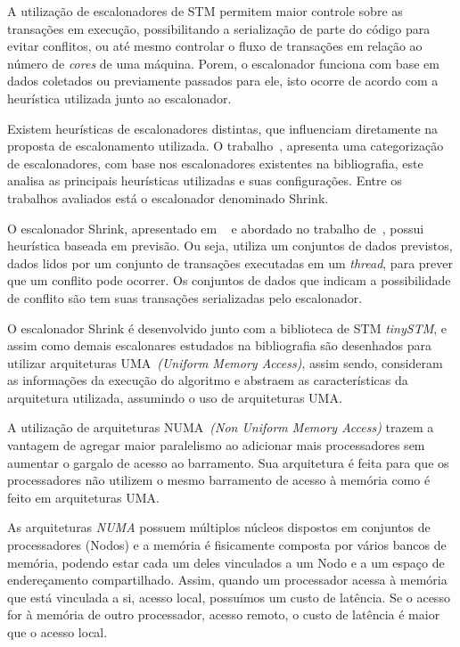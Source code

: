 \documentclass[diss-proposta,nocipinfo]{texufpel}
\begin{document}
A utilização de escalonadores de STM permitem maior controle sobre as transações em execução, possibilitando a serialização de parte do código para evitar conflitos, ou até mesmo controlar o fluxo de transações em relação ao número de \emph{cores} de uma máquina. Porem, o escalonador funciona com base em dados coletados ou previamente passados para ele, isto ocorre de acordo com a heurística utilizada junto ao escalonador.

Existem heurísticas de escalonadores distintas, que influenciam diretamente na proposta de escalonamento utilizada. O trabalho~\cite{sanzo17}, apresenta uma categorização de escalonadores, com base nos escalonadores existentes na bibliografia, este analisa as principais heurísticas utilizadas e suas configurações. Entre os trabalhos avaliados está o escalonador denominado Shrink.

O escalonador Shrink, apresentado em ~\cite{dragojevic09} e abordado no trabalho de~\cite{sanzo17}, possui heurística baseada em previsão. Ou seja, utiliza um conjuntos de dados previstos, dados lidos por um conjunto de transações executadas em um \emph{thread}, para prever que um conflito pode ocorrer. Os conjuntos de dados que indicam a possibilidade de conflito são tem suas transações serializadas pelo escalonador.

O escalonador Shrink é desenvolvido junto com a biblioteca de STM \emph{tinySTM}, e assim como demais escalonares estudados na bibliografia são desenhados para utilizar arquiteturas UMA~\emph{(Uniform Memory Access)}, assim sendo, consideram as informações da execução do algoritmo e abstraem as características da arquitetura utilizada, assumindo o uso de arquiteturas UMA.

A utilização de arquiteturas NUMA~\emph{(Non Uniform Memory Access)} trazem a vantagem de agregar maior paralelismo ao adicionar mais processadores sem aumentar o gargalo de acesso ao barramento. Sua arquitetura é feita para que os processadores não utilizem o mesmo barramento de acesso à memória como é feito em arquiteturas UMA.

As arquiteturas \emph{NUMA} possuem múltiplos núcleos dispostos em conjuntos de processadores (Nodos) e a memória é fisicamente composta por vários bancos de memória, podendo estar cada um deles vinculados a um Nodo e a um espaço de endereçamento compartilhado. Assim, quando um processador acessa à memória que está vinculada a si, acesso local, possuímos um custo de latência. Se o acesso for à memória de outro processador, acesso remoto, o custo de latência é maior que o acesso local.
\end{document}
